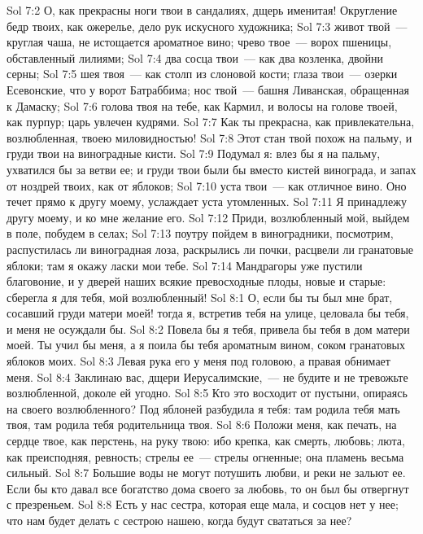 \vs Sol 7:2 О, как прекрасны ноги твои в сандалиях, дщерь именитая! Округление бедр твоих, как ожерелье, дело рук искусного художника;
\vs Sol 7:3 живот твой~--- круглая чаша,  не истощается ароматное вино; чрево твое~--- ворох пшеницы, обставленный лилиями;
\vs Sol 7:4 два сосца твои~--- как два козленка, двойни серны;
\vs Sol 7:5 шея твоя~--- как столп из слоновой кости; глаза твои~--- озерки Есевонские, что у ворот Батраббима; нос твой~--- башня Ливанская, обращенная к Дамаску;
\vs Sol 7:6 голова твоя на тебе, как Кармил, и волосы на голове твоей, как пурпур; царь увлечен  кудрями.
\vs Sol 7:7 Как ты прекрасна, как привлекательна, возлюбленная, твоею миловидностью!
\vs Sol 7:8 Этот стан твой похож на пальму, и груди твои на виноградные кисти.
\vs Sol 7:9 Подумал я: влез бы я на пальму, ухватился бы за ветви ее; и груди твои были бы вместо кистей винограда, и запах от ноздрей твоих, как от яблоков;
\vs Sol 7:10 уста твои~--- как отличное вино. Оно течет прямо к другу моему, услаждает уста утомленных.
\vs Sol 7:11 Я принадлежу другу моему, и ко мне  желание его.
\vs Sol 7:12 Приди, возлюбленный мой, выйдем в поле, побудем в селах;
\vs Sol 7:13 поутру пойдем в виноградники, посмотрим, распустилась ли виноградная лоза, раскрылись ли почки, расцвели ли гранатовые яблоки; там я окажу ласки мои тебе.
\vs Sol 7:14 Мандрагоры уже пустили благовоние, и у дверей наших всякие превосходные плоды, новые и старые:  сберегла я для тебя, мой возлюбленный!
\vs Sol 8:1 О, если бы ты был мне брат, сосавший груди матери моей! тогда я, встретив тебя на улице, целовала бы тебя, и меня не осуждали бы.
\vs Sol 8:2 Повела бы я тебя, привела бы тебя в дом матери моей. Ты учил бы меня, а я поила бы тебя ароматным вином, соком гранатовых яблоков моих.
\vs Sol 8:3 Левая рука его у меня под головою, а правая обнимает меня.
\vs Sol 8:4 Заклинаю вас, дщери Иерусалимские,~--- не будите и не тревожьте возлюбленной, доколе ей угодно.
\rsbpar\vs Sol 8:5 Кто это восходит от пустыни, опираясь на своего возлюбленного? Под яблоней разбудила я тебя: там родила тебя мать твоя, там родила тебя родительница твоя.
\vs Sol 8:6 Положи меня, как печать, на сердце твое, как перстень, на руку твою: ибо крепка, как смерть, любовь; люта, как преисподняя, ревность; стрелы ее~--- стрелы огненные; она пламень весьма сильный.
\vs Sol 8:7 Большие воды не могут потушить любви, и реки не зальют ее. Если бы кто давал все богатство дома своего за любовь, то он был бы отвергнут с презреньем.
\rsbpar\vs Sol 8:8 Есть у нас сестра, которая еще мала, и сосцов нет у нее; что нам будет делать с сестрою нашею, когда будут свататься за нее?
